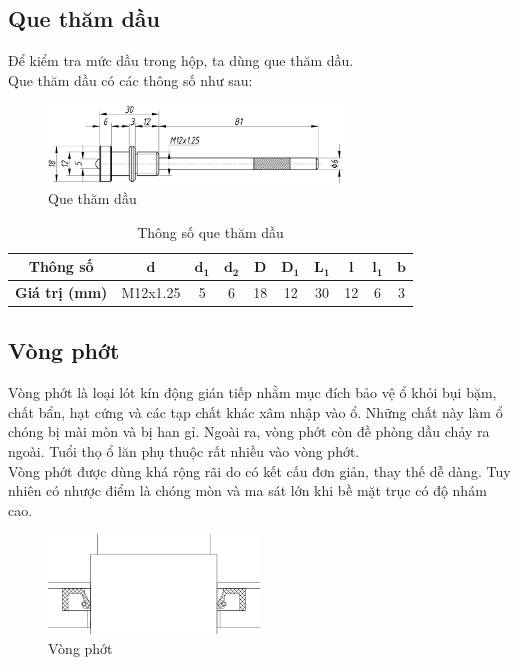         \subsection{Que thăm dầu}
            \hspace*{0.6cm}Để kiểm tra mức dầu trong hộp, ta dùng que thăm dầu.\\
            \hspace*{0.6cm}Que thăm dầu có các thông số như sau:
            \begin{figure}[H]
                \centering
                \includegraphics[width=0.7\textwidth]{pictures/oil_dipstick.png}
                \caption{Que thăm dầu}
                \label{oil_dipstick}
            \end{figure}
            \begin{table}[H]
                \centering
                \begin{tabular}{|c|c|c|c|c|c|c|c|c|c|}
                    \hline
                    \textbf{Thông số} & $\mathbf{d}$ & $\mathbf{d_1}$ & $\mathbf{d_2}$ & $\mathbf{D}$ & $\mathbf{D_1}$ & $\mathbf{L_1}$ & $\mathbf{l}$ & $\mathbf{l_1}$ & $\mathbf{b}$ \\
                    \hline
                    \textbf{Giá trị (mm)} & M12x1.25 & 5 & 6 & 18 & 12 & 30 & 12 & 6 & 3 \\
                    \hline
                \end{tabular}     
                \caption{Thông số que thăm dầu}           
            \end{table}
        \subsection{Vòng phớt}
            \hspace*{0.6cm}Vòng phớt là loại lót kín động gián tiếp nhằm mục đích bảo vệ ổ khỏi bụi bặm, chất bẩn, hạt cứng và các tạp chất khác xâm nhập vào ổ. Những chất này làm ổ chóng bị mài mòn và bị han gỉ. Ngoài ra, vòng phớt còn đề phòng dầu chảy ra ngoài. Tuổi thọ ổ lăn phụ thuộc rất nhiều vào vòng phớt. \\
            \hspace*{0.6cm}Vòng phớt được dùng khá rộng rãi do có kết cấu đơn giản, thay thế dễ dàng. Tuy nhiên có nhược điểm là chóng mòn và ma sát lớn khi bề mặt trục có độ nhám cao. 
            \begin{figure}[H]
                \centering
                \includegraphics[width=0.5\textwidth]{pictures/seal.png}
                \caption{Vòng phớt}
                \label{seal}
            \end{figure}
